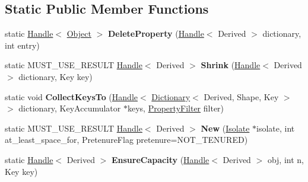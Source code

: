 \subsection*{Static Public Member Functions}
\begin{DoxyCompactItemize}
\item 
static \hyperlink{classv8_1_1internal_1_1_handle}{Handle}$<$ \hyperlink{classv8_1_1internal_1_1_object}{Object} $>$ {\bfseries Delete\+Property} (\hyperlink{classv8_1_1internal_1_1_handle}{Handle}$<$ Derived $>$ dictionary, int entry)\hypertarget{classv8_1_1internal_1_1_dictionary_a48a5047e2d7edde0463d79980a16041b}{}\label{classv8_1_1internal_1_1_dictionary_a48a5047e2d7edde0463d79980a16041b}

\item 
static M\+U\+S\+T\+\_\+\+U\+S\+E\+\_\+\+R\+E\+S\+U\+LT \hyperlink{classv8_1_1internal_1_1_handle}{Handle}$<$ Derived $>$ {\bfseries Shrink} (\hyperlink{classv8_1_1internal_1_1_handle}{Handle}$<$ Derived $>$ dictionary, Key key)\hypertarget{classv8_1_1internal_1_1_dictionary_aae05e9e26a511fba0d89a0d83d801b4d}{}\label{classv8_1_1internal_1_1_dictionary_aae05e9e26a511fba0d89a0d83d801b4d}

\item 
static void {\bfseries Collect\+Keys\+To} (\hyperlink{classv8_1_1internal_1_1_handle}{Handle}$<$ \hyperlink{classv8_1_1internal_1_1_dictionary}{Dictionary}$<$ Derived, Shape, Key $>$ $>$ dictionary, Key\+Accumulator $\ast$keys, \hyperlink{namespacev8_afbf02b6b1152a3e25d7bde90798209ac}{Property\+Filter} filter)\hypertarget{classv8_1_1internal_1_1_dictionary_a5384683d07782dd361117777bac924b9}{}\label{classv8_1_1internal_1_1_dictionary_a5384683d07782dd361117777bac924b9}

\item 
static M\+U\+S\+T\+\_\+\+U\+S\+E\+\_\+\+R\+E\+S\+U\+LT \hyperlink{classv8_1_1internal_1_1_handle}{Handle}$<$ Derived $>$ {\bfseries New} (\hyperlink{classv8_1_1internal_1_1_isolate}{Isolate} $\ast$isolate, int at\+\_\+least\+\_\+space\+\_\+for, Pretenure\+Flag pretenure=N\+O\+T\+\_\+\+T\+E\+N\+U\+R\+ED)\hypertarget{classv8_1_1internal_1_1_dictionary_a1e58e4d3d15a70c2065fac79b8bff262}{}\label{classv8_1_1internal_1_1_dictionary_a1e58e4d3d15a70c2065fac79b8bff262}

\item 
static \hyperlink{classv8_1_1internal_1_1_handle}{Handle}$<$ Derived $>$ {\bfseries Ensure\+Capacity} (\hyperlink{classv8_1_1internal_1_1_handle}{Handle}$<$ Derived $>$ obj, int n, Key key)\hypertarget{classv8_1_1internal_1_1_dictionary_a3278fe262a0a67f04c43fdca7079b288}{}\label{classv8_1_1internal_1_1_dictionary_a3278fe262a0a67f04c43fdca7079b288}


\end{DoxyCompactItemize}
